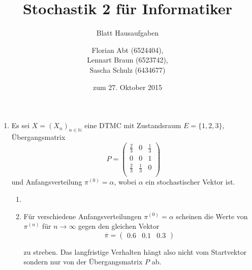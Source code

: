 \documentclass[a4paper]{scrartcl}
\title{Stochastik 2 für Informatiker}
\subtitle{Blatt {\blattnr} Hausaufgaben}
\author{
    Florian Abt (6524404), \\
    Lennart Braun (6523742), \\
    Sascha Schulz (6434677)
}
\date{zum 27. Oktober 2015}
\newcommand{\N}{\mathbb{N}}
\def \blattnr {2}
\begin{document}
\maketitle

\begin{enumerate}[label=\bfseries \blattnr.\arabic*]
    \item
        Es sei $X = (X_n)_{n \in \N}$ eine DTMC mit Zustandsraum $E =
        \{1,2,3\}$, Übergangsmatrix
        \begin{equation*}
            P =
            \begin{pmatrix}
                \frac{2}{3} & 0 & \frac{1}{3} \\
                0 & 0 & 1 \\
                \frac{2}{3} & \frac{1}{3} & 0 \\
            \end{pmatrix}
        \end{equation*}
        und Anfangsverteilung $\pi^{(0)} = \alpha$, wobei $\alpha$ ein
        stochastischer Vektor ist.
        \begin{enumerate}[label=\alph*)]
            \item
                

            \item
                Für verschiedene Anfangsverteilungen $\pi^{(0)} = \alpha$
                scheinen die Werte von $\pi^{(n)}$ für $n \to \infty$ gegen den
                gleichen Vektor
                \begin{equation*}
                    \overline{\pi} =
                    \begin{pmatrix}
                        \num{0,6} & \num{0,1} & \num{0,3}
                    \end{pmatrix}
                \end{equation*}
                                                                    
                zu streben. Das langfristige Verhalten hängt also nicht vom
                Startvektor sondern nur von der Übergangsmatrix $P$ ab.

        \end{enumerate}


\end{enumerate}
\end{document}
